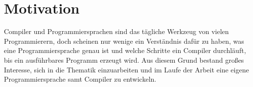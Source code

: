 \section{Motivation}
Compiler und Programmiersprachen sind das tägliche Werkzeug von vielen Programmierern, doch scheinen nur wenige ein Verständnis dafür zu haben, was eine Programmiersprache genau ist und welche Schritte ein Compiler durchläuft, bis ein ausführbares Programm erzeugt wird. Aus diesem Grund bestand großes Interesse, sich in die Thematik einzuarbeiten und im Laufe der Arbeit eine eigene Programmiersprache samt Compiler zu entwickeln.